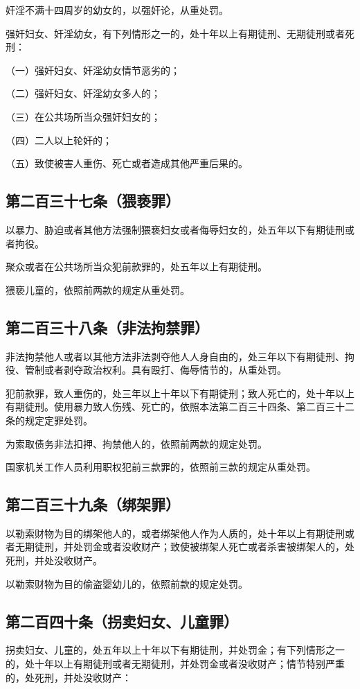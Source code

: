\documentclass[utf-8,10pt]{ctexart}
\begin{document}
奸淫不满十四周岁的幼女的，以强奸论，从重处罚。

强奸妇女、奸淫幼女，有下列情形之一的，处十年以上有期徒刑、无期徒刑或者死刑：

（一）强奸妇女、奸淫幼女情节恶劣的；

（二）强奸妇女、奸淫幼女多人的；

（三）在公共场所当众强奸妇女的；

（四）二人以上轮奸的；

（五）致使被害人重伤、死亡或者造成其他严重后果的。
\subsection{第二百三十七条（猥亵罪）}
以暴力、胁迫或者其他方法强制猥亵妇女或者侮辱妇女的，处五年以下有期徒刑或者拘役。

聚众或者在公共场所当众犯前款罪的，处五年以上有期徒刑。

猥亵儿童的，依照前两款的规定从重处罚。
\subsection{第二百三十八条（非法拘禁罪）}
非法拘禁他人或者以其他方法非法剥夺他人人身自由的，处三年以下有期徒刑、拘役、管制或者剥夺政治权利。具有殴打、侮辱情节的，从重处罚。

犯前款罪，致人重伤的，处三年以上十年以下有期徒刑；致人死亡的，处十年以上有期徒刑。使用暴力致人伤残、死亡的，依照本法第二百三十四条、第二百三十二条的规定定罪处罚。

为索取债务非法扣押、拘禁他人的，依照前两款的规定处罚。

国家机关工作人员利用职权犯前三款罪的，依照前三款的规定从重处罚。
\subsection{第二百三十九条（绑架罪）}
以勒索财物为目的绑架他人的，或者绑架他人作为人质的，处十年以上有期徒刑或者无期徒刑，并处罚金或者没收财产；致使被绑架人死亡或者杀害被绑架人的，处死刑，并处没收财产。

以勒索财物为目的偷盗婴幼儿的，依照前款的规定处罚。
\subsection{第二百四十条（拐卖妇女、儿童罪）}
拐卖妇女、儿童的，处五年以上十年以下有期徒刑，并处罚金；有下列情形之一的，处十年以上有期徒刑或者无期徒刑，并处罚金或者没收财产；情节特别严重的，处死刑，并处没收财产：
\end{document}
